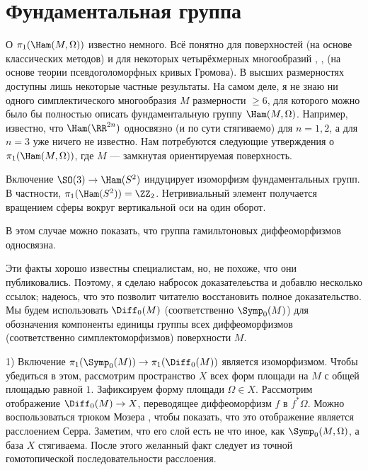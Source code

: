 \section{Фундаментальная группа}
О $\pi_1 (\Ham (M, \Omega))$ известно немного.
Всё понятно для поверхностей (на основе классических методов) и для некоторых четырёхмерных многообразий \cite{G1}, \cite{A}, \cite{AM} (на основе теории псевдоголоморфных кривых Громова).
В высших размерностях доступны лишь некоторые частные результаты.
На самом деле, я не знаю ни одного симплектического многообразия $M$ размерности $\ge 6$, для которого можно было бы полностью описать фундаментальную группу $\Ham (M, \Omega)$.
Например, известно, что $\Ham (\RR^{2n})$ односвязно (и по сути стягиваемо) для $n = 1, 2$, а для $n = 3$ уже ничего не известно.
Нам потребуются следующие утверждения о $\pi_1 (\Ham (M, \Omega))$, где $M$ --- замкнутая ориентируемая поверхность.

\begin{thm}{}\label{7.2.A}
Включение $\SO (3) \to \Ham (S^2)$ индуцирует изоморфизм фундаментальных групп.
В частности, $\pi_1 (\Ham (S^2))=\ZZ_2$.
Нетривиальный элемент получается вращением сферы вокруг вертикальной оси на один оборот.
\end{thm}

\begin{thm}{}
\label{7.2.B}
В этом случае можно показать, что группа гамильтоновых диффеоморфизмов односвязна.
\end{thm}

Эти факты хорошо известны специалистам, но, не похоже, что они публиковались.
Поэтому, я сделаю набросок доказателеьства и добавлю несколько ссылок;
надеюсь, что это позволит читателю восстановить полное доказательство.
Мы будем использовать $\Diff_0 (M)$ (соответственно $\Symp_0 (M)$) для обозначения компоненты единицы группы всех диффеоморфизмов (соответственно симплектоморфизмов) поверхности $M$.


1) Включение $\pi_1 (\Symp_0 (M)) \to \pi_1 (\Diff_0 (M))$ является изоморфизмом.
Чтобы убедиться в этом, рассмотрим пространство $X$ всех форм площади на $M$ с общей площадью равной $1$.
Зафиксируем форму площади $\Omega \in X$.
Рассмотрим отображение $\Diff_0 (M) \to X$, переводящее диффеоморфизм $f$ в $f^\ast \Omega$.
Можно воспользоваться трюком Мозера \cite[p. 94--95]{MS}, чтобы показать, что это отображение является расслоением Серра.
Заметим, что его слой есть не что иное, как $\Symp_0 (M, \Omega)$, а база $X$ стягиваема.
После этого желанный факт следует из точной гомотопической последовательности расслоения.

